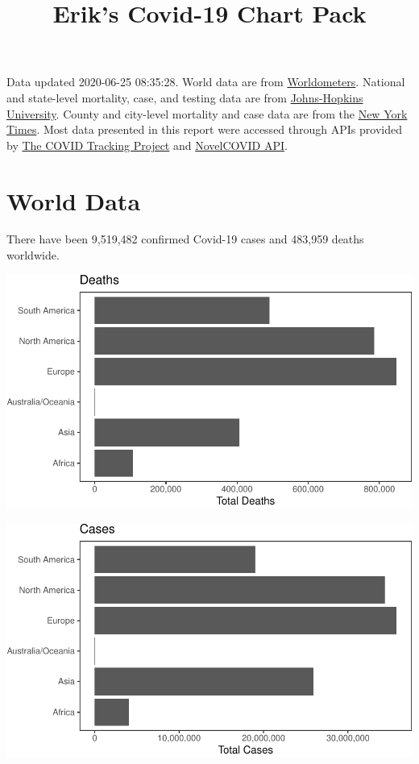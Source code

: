 \documentclass[]{article}
\title{Erik's Covid-19 Chart Pack}
\author{}
\date{}
\begin{document}
\maketitle

Data updated 2020-06-25 08:35:28. World data are from
\href{https://github.com/NovelCovid/API}{Worldometers}. National and
state-level mortality, case, and testing data are from
\href{https://covidtracking.com}{Johns-Hopkins University}. County and
city-level mortality and case data are from the
\href{https://github.com/NovelCovid/API}{New York Times}. Most data
presented in this report were accessed through APIs provided by
\href{https://covidtracking.com}{The COVID Tracking Project} and
\href{https://github.com/NovelCovid/API}{NovelCOVID API}.

\hypertarget{world-data}{%
\section{World Data}\label{world-data}}

There have been 9,519,482 confirmed Covid-19 cases and 483,959 deaths
worldwide.

\includegraphics{covid_files/figure-latex/unnamed-chunk-1-1.pdf}

\includegraphics{covid_files/figure-latex/unnamed-chunk-2-1.pdf}
\end{document}
